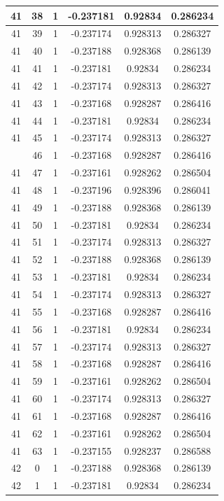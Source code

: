 \documentclass[12pt,a4paper]{article}
\numberwithin{equation}{section}
\numberwithin{figure}{section}
\numberwithin{table}{section}
\begin{document}
\begin{longtable}{|c|c|c|c|c|c|}
41 & 38 & 1 & -0.237181 & 0.92834 & 0.286234 \\ \hline
41 & 39 & 1 & -0.237174 & 0.928313 & 0.286327 \\ \hline
41 & 40 & 1 & -0.237188 & 0.928368 & 0.286139 \\ \hline
41 & 41 & 1 & -0.237181 & 0.92834 & 0.286234 \\ \hline
41 & 42 & 1 & -0.237174 & 0.928313 & 0.286327 \\ \hline
41 & 43 & 1 & -0.237168 & 0.928287 & 0.286416 \\ \hline
41 & 44 & 1 & -0.237181 & 0.92834 & 0.286234 \\ \hline
41 & 45 & 1 & -0.237174 & 0.928313 & 0.286327 \\ \hline
\pagebreak
41 & 46 & 1 & -0.237168 & 0.928287 & 0.286416 \\ \hline
41 & 47 & 1 & -0.237161 & 0.928262 & 0.286504 \\ \hline
41 & 48 & 1 & -0.237196 & 0.928396 & 0.286041 \\ \hline
41 & 49 & 1 & -0.237188 & 0.928368 & 0.286139 \\ \hline
41 & 50 & 1 & -0.237181 & 0.92834 & 0.286234 \\ \hline
41 & 51 & 1 & -0.237174 & 0.928313 & 0.286327 \\ \hline
41 & 52 & 1 & -0.237188 & 0.928368 & 0.286139 \\ \hline
41 & 53 & 1 & -0.237181 & 0.92834 & 0.286234 \\ \hline
41 & 54 & 1 & -0.237174 & 0.928313 & 0.286327 \\ \hline
41 & 55 & 1 & -0.237168 & 0.928287 & 0.286416 \\ \hline
41 & 56 & 1 & -0.237181 & 0.92834 & 0.286234 \\ \hline
41 & 57 & 1 & -0.237174 & 0.928313 & 0.286327 \\ \hline
41 & 58 & 1 & -0.237168 & 0.928287 & 0.286416 \\ \hline
41 & 59 & 1 & -0.237161 & 0.928262 & 0.286504 \\ \hline
41 & 60 & 1 & -0.237174 & 0.928313 & 0.286327 \\ \hline
41 & 61 & 1 & -0.237168 & 0.928287 & 0.286416 \\ \hline
41 & 62 & 1 & -0.237161 & 0.928262 & 0.286504 \\ \hline
41 & 63 & 1 & -0.237155 & 0.928237 & 0.286588 \\ \hline
42 & 0 & 1 & -0.237188 & 0.928368 & 0.286139 \\ \hline
42 & 1 & 1 & -0.237181 & 0.92834 & 0.286234 \\ \hline

\end{longtable}
\end{document}

